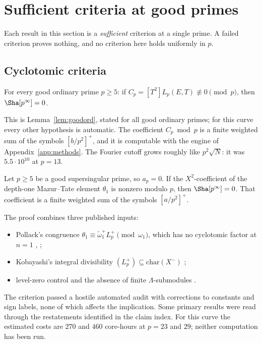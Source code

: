 \section{Sufficient criteria at good primes}\label{sec:goodprimes}

Each result in this section is a \emph{sufficient} criterion at a single prime. A failed criterion proves nothing, and no criterion here holds uniformly in $p$.

\subsection{Cyclotomic criteria}
\begin{criterion}\label{crit:cyclo}
For every good ordinary prime $p\ge5$: if $C_p=[T^2]L_p(E,T)\not\equiv0\pmod p$, then $\Sha[p^\infty]=0$.
\end{criterion}
This is Lemma~\ref{lem:goodord}, stated for all good ordinary primes; for this curve every other hypothesis is automatic. The coefficient $C_p\bmod p$ is a finite weighted sum of the symbols $[b/p^2]^+$, and it is computable with the engine of Appendix~\ref{app:methods}. The Fourier cutoff grows roughly like $p^2\sqrt N$: it was $5.5\cdot10^{10}$ at $p=13$.

\begin{criterion}\label{crit:ss}
Let $p\ge5$ be a good supersingular prime, so $a_p=0$. If the $X^2$-coefficient of the depth-one Mazur--Tate element $\theta_1$ is nonzero modulo $p$, then $\Sha[p^\infty]=0$. That coefficient is a finite weighted sum of the symbols $[a/p^2]^+$.
\end{criterion}
The proof combines three published inputs:
\begin{itemize}[leftmargin=*]
\item Pollack's congruence $\theta_1\equiv\widetilde\omega_1^{+}L_p^{+}\pmod{\omega_1}$, which has no cyclotomic factor at $n=1$ \cite[Prop.~6.18]{pollack}, \cite[Prop.~1.11]{kimkurihara};
\item Kobayashi's integral divisibility $(L_p^+)\subseteq\mathrm{char}(X^-)$ \cite{kobayashi};
\item level-zero control and the absence of finite $\Lambda$-submodules \cite{kitajima}.
\end{itemize}
The criterion passed a hostile automated audit with corrections to constants and sign labels, none of which affects the implication. Some primary results were read through the restatements identified in the claim index. For this curve the estimated costs are $270$ and $460$ core-hours at $p=23$ and $29$; neither computation has been run.


